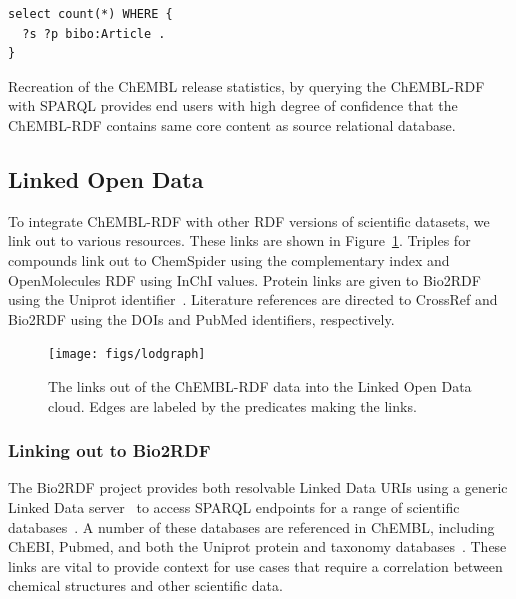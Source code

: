 \documentclass[10pt]{bmc_article}
\newenvironment{bmcformat}{\begin{raggedright}\baselineskip20pt\sloppy\setboolean{publ}{false}}{\end{raggedright}\baselineskip20pt\sloppy}
\begin{document}
\begin{bmcformat}
\begin{small}
\begin{verbatim}
select count(*) WHERE {
  ?s ?p bibo:Article .
}
\end{verbatim}
\end{small}

Recreation of the ChEMBL release statistics, by querying the ChEMBL-RDF with SPARQL 
provides end users with high degree of confidence that the ChEMBL-RDF contains same 
core content as source relational database. 


\subsection*{Linked Open Data}

To integrate ChEMBL-RDF with other RDF versions of scientific datasets, we link out to various resources.
These links are shown in Figure~\ref{2}. Triples for compounds link out to ChemSpider 
using the complementary index and OpenMolecules RDF using InChI values. Protein links are given to Bio2RDF~\cite{Belleau2008}
using the Uniprot identifier~\cite{TheUniProtConsortium2010}. Literature references are directed to CrossRef and Bio2RDF 
using the DOIs and PubMed identifiers, respectively.

\begin{figure}[t]
{\center
\texttt{[image: figs/lodgraph]}
\caption{The links out of the ChEMBL-RDF data into the Linked Open Data cloud.
Edges are labeled by the predicates making the links.}\label{2}
}
\end{figure}

\subsubsection*{Linking out to Bio2RDF}

The Bio2RDF project provides both resolvable Linked Data URIs using a generic Linked Data
server~\cite{Ansell2011} to access SPARQL endpoints for a range of scientific databases~\cite{Belleau2008}.
A number of these databases are referenced in ChEMBL, including ChEBI, Pubmed, and both the
Uniprot protein and taxonomy databases~\cite{TheUniProtConsortium2010}. These links are
vital to provide context for use cases that require a correlation between chemical
structures and other scientific data. 

%
%


\end{bmcformat}
\end{document}
